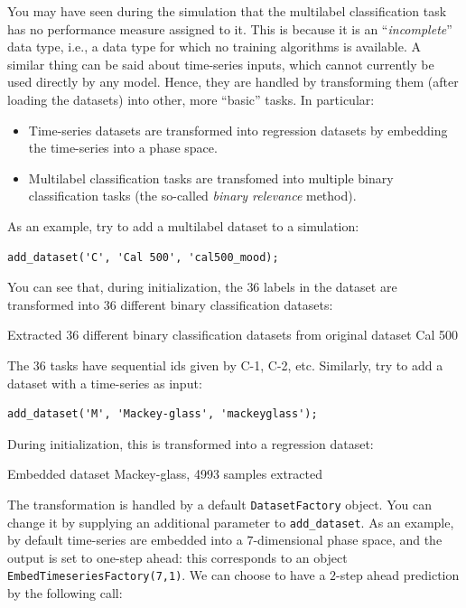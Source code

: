 You may have seen during the simulation that the multilabel classification task has no performance measure assigned to it. This is because it is an ``\textit{incomplete}'' data type, i.e., a data type for which no training algorithms is available. A similar thing can be said about time-series inputs, which cannot currently be used directly by any model. Hence, they are handled by transforming them (after loading the datasets) into other, more ``basic'' tasks. In particular:

\begin{itemize}
\item Time-series datasets are transformed into regression datasets by embedding the time-series into a phase space.
\item Multilabel classification tasks are transfomed into multiple binary classification tasks (the so-called \textit{binary relevance} method).
\end{itemize}

As an example, try to add a multilabel dataset to a simulation:

\begin{lstlisting}
add_dataset('C', 'Cal 500', 'cal500_mood);
\end{lstlisting}

\noindent You can see that, during initialization, the $36$ labels in the dataset are transformed into $36$ different binary classification datasets:

\begin{console}
Extracted 36 different binary classification datasets from original
  dataset Cal 500
\end{console}

\noindent The $36$ tasks have sequential ids given by C-1, C-2, etc. Similarly, try to add a dataset with a time-series as input:

\begin{lstlisting}
add_dataset('M', 'Mackey-glass', 'mackeyglass');
\end{lstlisting}

\noindent During initialization, this is transformed into a regression dataset:

\begin{console}
Embedded dataset Mackey-glass, 4993 samples extracted
\end{console}

The transformation is handled by a default \verb|DatasetFactory| object. You can change it by supplying an additional parameter to \verb|add_dataset|. As an example, by default time-series are embedded into a $7$-dimensional phase space, and the output is set to one-step ahead: this corresponds to an object \verb|EmbedTimeseriesFactory(7,1)|. We can choose to have a $2$-step ahead prediction by the following call:

